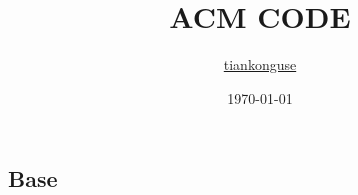 \documentclass[a4paper]{article}
\title{ACM CODE}
\author{\href{http://tiankonguse.com/}{tiankonguse}}
\date{\today}
\begin{document}
\begin{CJK*}{UTF8}{gbsn}

\begin{onecolumn}

\maketitle


\end{onecolumn}

\clearpage


\clearpage

\begin{multicols}{3}

\renewcommand{\contentsname}{目录}

\tableofcontents

\clearpage 

\begin{flushleft} 

% 
%
% 
%
%
%
\section{Base}

\end{flushleft}
\end{multicols}
\end{CJK*}
\end{document}
